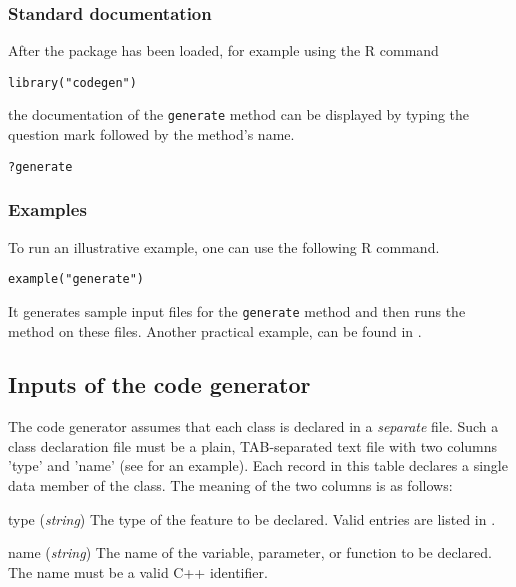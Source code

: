 \subsubsection*{Standard documentation}
After the  package has been loaded, for example using the R command

\begin{lstlisting}[style=R]
library("codegen")
\end{lstlisting}

the documentation of the \texttt{generate} method can be displayed by typing the question mark followed by the method's name.

\begin{lstlisting}[style=R]
?generate
\end{lstlisting}

\subsubsection*{Examples}
To run an illustrative example, one can use the following R command.

\begin{lstlisting}[style=R]
example("generate")
\end{lstlisting}

It generates sample input files for the \texttt{generate} method and then runs the method on these files. Another practical example, can be found in .

\subsection{Inputs of the code generator} \label{sec:concept-autocode-codegen-input}

The code generator assumes that each class is declared in a \emph{separate} file. Such a class declaration file must be a plain, TAB-separated text file with two columns 'type' and 'name' (see  for an example). Each record in this table declares a single data member of the class. The meaning of the two columns is as follows:

\begin{columndef}
  \item [type] (\textit{string}) The type of the feature to be declared. Valid entries are listed in .
  \item [name] (\textit{string}) The name of the variable, parameter, or function to be declared. The name must be a valid C++ identifier.
\end{columndef}

